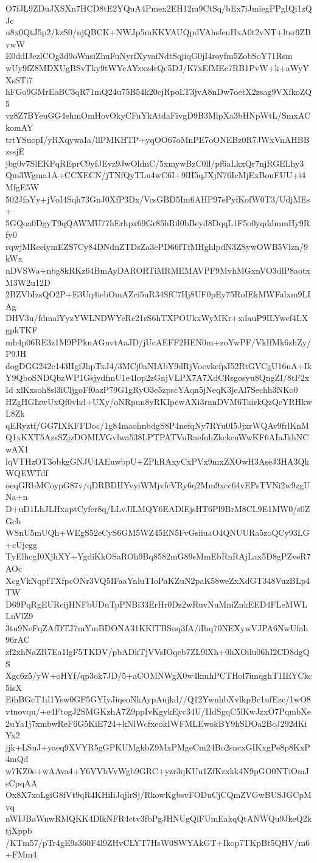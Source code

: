 O7fJL9ZDuJXSXn7HCD8tE2YQuA4Pmex2EH12m9CtSq/bEx7iJmiegPPgIQi1zQJc
u8x0QtJ5p2/kzS0/njQBCK+NWJp5mKKVAUQpdVAhsfeuHxA0t2vNT+ltsr9ZBvwW
E0ddIJezlCOg3d9oWnsiZhuFuNyrfXyvaiNdtSqjiqG0jI4royfm5ZobSoY71Rsm
wUy9fZ8MDXUgBSvTky9tWYcAYzxz4rQe5DJ/K7xEfMEc7RB1PvW+k+aWyYXsSTi7
hFGo9GMrEoBC3qR71mQ24u75B54k20cjRpoLT3jvA8nDw7oetX2zsag9VXfkoZQ5
vz8Z7BYeuGG4ehmOmHovOkyCFuYkAtdaFivgD9B3MlpXa3bHNpWtL/SmxACkomAY
trtYSuopI/yRXqywaIa/llPMKHTP+yqOO67oMnPE7oONEBz0R7JWxVnAHBBzssjE
jbg0v7SlEKFqREprC9yfJEvz9JwOldnC/5xmywBzC0ll/pf6aLkxQr7njRGELhy3
Qm3Wgma1A+CCXECN/jTNfQyTLu4wC6I+9lH5qJXjN76IcMjExBouFUU+i4MfgE5W
502JfaYy+jVoI4Sqh73GnJ0XfP3Dx/VcsGBD5Im6AHP97ePyfKofW0T3/UdjMEs+
5GQoa0DgyT9qQAWMU77hErhpx69Gr85hRil0bBeyd8DqqL1F5o0yqddmmHy9Rfy0
rqwjMReeiymEZS7Cy84DNdnZTDsZa3ePD66fTfMHghlpdN3ZSywOWB5Vlzn/9kWx
nDVSWa+nbg8kRKz64BmAyDARORTiMRMEMAVPF9MvhMGxnVO3dlP8aotxM3W2u12D
2BZVbIzsQO2P+E3Uq4iebOmAZci5uR34SfC7Hj8UF0pEy75RoIEkMWFalxm9LIAg
DHV3u/fdmalYyzYWLNDWYeRc21rS6hTXPOUkxWyMKr+xdauP9ILYwcf4LXgpkTKF
mh4p06RE3z1M9PPkuAGnvtAaJD/jUcAEFF2HEN0m+zoYwPF/VkIfMk6zhZy/P9JH
dogDGG242c143HgfJhpTxJ4/3MCj0aNIAbY9dRjVocvkefpJ52RtGVCgU16uA+Ik
Y9QboSNDQbzWP1GsjydfmU1e4Iop2zGnjVLPX7A7XdCRsgosyu8QngZI/8tF2xId
xlKxsoh8sl3iCljgoFf0azP79G1gRyO3e5zpscYAqn5jNeqK3jeAl7Sechh3NKo0
HZgHGIzwUxQf0vhd+UXy/oNRpun8yRKIpewAXi3rnnDVM6TairkQzQcYRHkwL8Zk
qERyztf/GG7IXKFFDoc/1g84maohnbdgS8P4nefqNy7RYu0I5JjxrWQAv9frlKnM
Q1xKXT5AzsSZjzDOMLVGvlwa538LPTPATVuRaefnhZkckcnWwKF6AIaJkhNCwAX1
lqVTHzOT3obkgGNJU4AEuwbpU+ZPhRAxyCxPVx9mxZXOwH3AseJ3HA3QkWQEWTdf
oeqGRbMCoypG87v/qDRBDHYvyiWMjvfcVRy6q2Mm9xcc64vEPsTVNi2w9zgUNa+n
D+uD1LhJLHxaptCyfcr8q/LLvJlLMQY6EADlEjsHT6Pl9BrM8CL9E1MW0/s0ZGcb
WSnU5mUQh+WEgS52eCyS6GM5WZ45EN5FvGsiiuaO4QNUURa5zoQCy93LG+cUjegg
TyElhcgI0XjhXY+YgdiKkOSaROh9Bq8582mG89sMmEbRnRAjLax5D8gPZveR7AOc
XcgVkNqpfTXfpcONr3VQ5IFaaYnluTIoPaKZuN2paK58weZxXdGT348VuzBLp4TW
D69PqRgEURcijHNFbUDuTpPNBi33ErHr0Dz2wRuvNuMniZnkEED4FLeMWLLnVlZ9
3tu9NeFqZAfDTJ7mYmBDONA31KKfTBSuq3fA/iIbq70NEXywVJPA6NwUfah96rAC
zf2xhNaZR7Ea1lgF5TKDV/pbADkTjVVsIOqeb7ZL9lXh+0hXOilu06hI2CD8dgQS
Xgc6z5/yW+oHYf/qp3ok7JD/5+aCOMNWgX0w4kmhPCTHol7imqghT1IEYCkc5isX
EihBGcT1d1Ysw0GF5GYIyJiqeoNkAypAujkd//Q12YwnhbXvlkpBc1ufEzc/1wO8
vtnovqu/+e4FtogJ2SMGKzhA7Z9ppIvKgykEyc34U/IIdSgqC5lKwJzxO7PqmbXe
2uYa1j7xmbwReF6G5KiE724+kNlWcfxeokIWFMLEwokBY9hSDOa2BcJ292dKiYx2
jjk+LSuJ+yaeq9XVYR5gGPKUMgkbZ9MxPMgeCm24Bo2sncxGIKxgPe8p8KxP4mQd
w7KZ0e+wAAva4+Y6VVbVvWgb9GRC+yzr3qKUu1ZfKzxkk4N9pGO0NTiOmJsCpqAA
Ox8X7xoLgiG8fVt9qR4KHiIiJqjlrSj/RkowKgbsvFODuCjCQmZVGwBUSJGCpMvq
nWIJBaWnwRMQKK4DlkNFR4ctv3fbPgJHNUgQlFUmEakqQtANWQu9JkeQ2ktjXppb
/KTm57/pTr4gE9s360F4l9ZHvCLYT7HsW0SWYAkGT+Ikop7TKpBt5QHV/m6+FMm4
